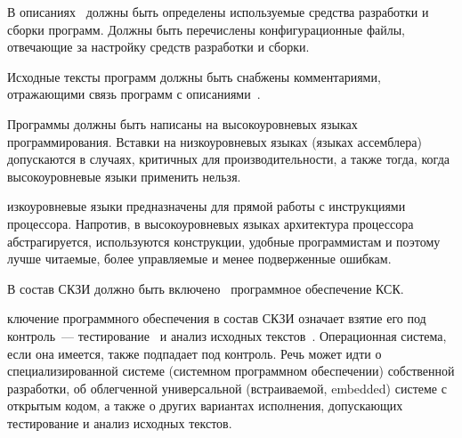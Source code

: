 \label{R.DI.Tools} %
В описаниях~ должны быть определены используемые средства
разработки и сборки программ. Должны быть перечислены конфигурационные файлы,
отвечающие за настройку средств разработки и сборки.

\label{R.DI.Comments} %
Исходные тексты программ должны быть снабжены комментариями,
отражающими связь программ с описаниями~.

\label{R.DI.Language} %
Программы должны быть написаны на высокоуровневых языках программирования.
Вставки на низкоуровневых языках (языках ассемблера) допускаются в случаях,
критичных для производительности, а также тогда, когда высокоуровневые языки
применить нельзя.

\begin{note*}
изкоуровневые языки предназначены для прямой работы с инструкциями 
процессора. Напротив, в высокоуровневых языках архитектура процессора 
абстрагируется, используются конструкции, удобные программистам и поэтому  
лучше читаемые, более управляемые и менее подверженные ошибкам.
\end{note*}

\label{R.DI.OS} %
В состав СКЗИ должно быть включено~ программное 
обеспечение КСК.

\begin{note*}
ключение программного обеспечения в состав СКЗИ означает 
взятие его под контроль~--- тестирование~
и анализ исходных текстов~. 
%
Операционная система, если она имеется, также подпадает под контроль. 
%
Речь может идти о специализированной системе (системном программном обеспечении) 
собственной разработки, об облегченной универсальной (встраиваемой, 
embedded) системе с открытым кодом, а также о других вариантах исполнения,
допускающих тестирование и анализ исходных текстов.
\end{note*}

